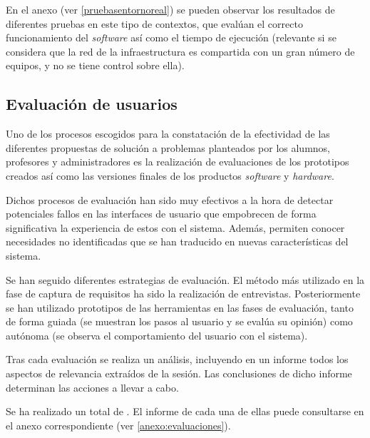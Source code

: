 En el anexo  (ver \ref{pruebasentornoreal}) se pueden observar los resultados de diferentes pruebas en este tipo de contextos, que evalúan el correcto funcionamiento del \textit{software} así como el tiempo de ejecución (relevante si se considera que la red de la infraestructura es compartida con un gran número de equipos, y no se tiene control sobre ella).


\subsection{Evaluación de usuarios}

Uno de los procesos escogidos para la constatación de la efectividad de las diferentes propuestas de solución a problemas planteados por los alumnos, profesores y administradores es la realización de evaluaciones de los prototipos creados así como las versiones finales de los productos \textit{software} y \textit{hardware}.

Dichos procesos de evaluación han sido muy efectivos a la hora de detectar potenciales fallos en las interfaces de usuario que empobrecen de forma significativa la experiencia de estos con el sistema. Además, permiten conocer necesidades no identificadas que se han traducido en nuevas características del sistema.

Se han seguido diferentes estrategias de evaluación. El método más utilizado en la fase de captura de requisitos ha sido la realización de entrevistas. Posteriormente se han utilizado prototipos de las herramientas en las fases de evaluación, tanto de forma guiada (se muestran los pasos al usuario y se evalúa su opinión) como autónoma (se observa el comportamiento del usuario con el sistema).

Tras cada evaluación se realiza un análisis, incluyendo en un informe todos los aspectos de relevancia extraídos de la sesión. Las conclusiones de dicho informe determinan las acciones a llevar a cabo.

Se ha realizado un total de . El informe de cada una de ellas puede consultarse en el anexo correspondiente (ver \ref{anexo:evaluaciones}).